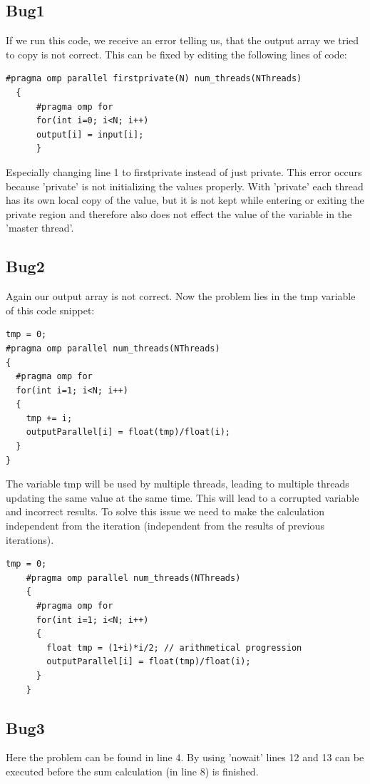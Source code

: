 \documentclass{article}
\begin{document}
\subsection*{Bug1}
If we run this code, we receive an error telling us, that the output array we tried to copy is not correct.
This can be fixed by editing the following lines of code:
\begin{lstlisting}[caption=Step 2]
  #pragma omp parallel firstprivate(N) num_threads(NThreads)
  {
      #pragma omp for 
      for(int i=0; i<N; i++)
      output[i] = input[i];
      }
\end{lstlisting}
Especially changing line 1 to firstprivate instead of just private.
This error occurs because 'private' is not initializing the values properly.
With 'private' each thread has its own local copy of the value, but it is not kept while entering or exiting the private region
and therefore also does not effect the value of the variable in the 'master thread'.
\subsection*{Bug2}
Again our output array is not correct.
Now the problem lies in the tmp variable of this code snippet:
\begin{lstlisting}[caption=Step 2]
tmp = 0;
#pragma omp parallel num_threads(NThreads)
{
  #pragma omp for 
  for(int i=1; i<N; i++)
  {
    tmp += i;
    outputParallel[i] = float(tmp)/float(i);
  }
}
\end{lstlisting}
The variable tmp will be used by multiple threads, leading to multiple threads updating the same value at the same time.
This will lead to a corrupted variable and incorrect results.
To solve this issue we need to make the calculation independent from the iteration (independent from the results of previous iterations).

\begin{lstlisting}[caption=Step 2]
    tmp = 0;
    #pragma omp parallel num_threads(NThreads)
    {
      #pragma omp for 
      for(int i=1; i<N; i++)
      {
        float tmp = (1+i)*i/2; // arithmetical progression
        outputParallel[i] = float(tmp)/float(i);
      }
    }
    \end{lstlisting}
\subsection*{Bug3}
Here the problem can be found in line 4.
By using 'nowait' lines 12 and 13 can be executed before the sum calculation (in line 8) is finished.
\end{document}

